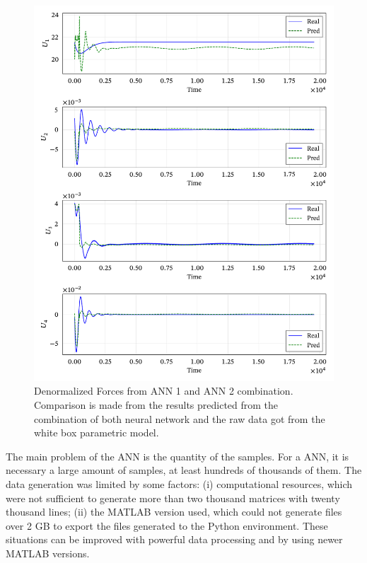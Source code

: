 \begin{figure}[!htb]
    \centering
    \caption[Denormalized Forces from ANN 1 and ANN 2 combination]{Denormalized Forces from ANN 1 and ANN 2 combination. Comparison is made from the results predicted from the combination of both neural network and the raw data got from the white box parametric model.}
    \includegraphics{figures/4results/uav/forces_denormalized.pdf}    

    \label{fig:forces_denormalized}
\end{figure}

The main problem of the ANN is the quantity of the samples.
For a ANN, it is necessary a large amount of samples, at least hundreds of thousands of them. 
The data generation was limited by some factors: (i) computational resources, which were not sufficient to generate more than two thousand matrices with twenty thousand lines; (ii) the MATLAB version used, which could not generate files over 2 GB to export the files generated to the Python environment. These situations can be improved with powerful data processing and by using newer MATLAB versions.

